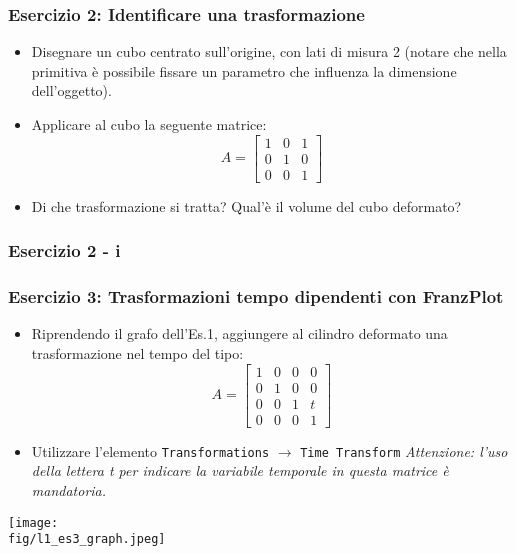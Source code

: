 \documentclass{beamer}
\newcommand{\fig}{figures}
\newcommand{\frnzplt}{FranzPlot }
\begin{document}
\begin{frame}
\frametitle{Esercizio 2: Identificare una trasformazione}
\begin{itemize}
\item Disegnare un  cubo centrato sull'origine, con lati di misura 2 (notare
che nella primitiva \`e possibile fissare un parametro che influenza la
dimensione dell'oggetto).  
\item Applicare al cubo la seguente matrice: 
\begin{displaymath}
A = \begin{bmatrix}
    1 & 0 & 1\\
    0 & 1 & 0\\
    0 & 0 & 1
    \end{bmatrix}
\end{displaymath}
\item Di che trasformazione si tratta? Qual'\`e il volume del cubo deformato?
\end{itemize}
\end{frame}
%
\begin{frame}
\frametitle{Esercizio 2 - i}
\begin{center}
\end{center}
\end{frame}
\begin{frame}
\frametitle{Esercizio 3: Trasformazioni tempo dipendenti con \frnzplt}
\begin{itemize}
\item Riprendendo il grafo dell'Es.1, aggiungere al cilindro deformato una trasformazione nel tempo del tipo:
\begin{displaymath}
A = \begin{bmatrix}
    1 & 0 & 0 & 0 \\
    0 & 1 & 0 & 0 \\
    0 & 0 & 1 & t \\
    0 & 0 & 0 & 1
    \end{bmatrix}
\end{displaymath}
\item Utilizzare l'elemento \texttt{Transformations} $\rightarrow$ \texttt{Time Transform} \textit{Attenzione: l'uso della lettera t per indicare la variabile temporale in questa matrice \`e mandatoria.}
\end{itemize}
\begin{center}
\texttt{[image: \\fig/l1\_es3\_graph.jpeg]}
\end{center}
\end{frame}
\end{document}
